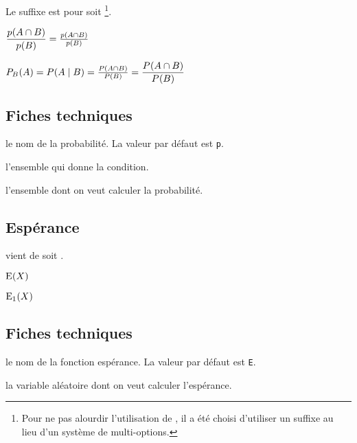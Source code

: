 \documentclass[12pt,a4paper]{article}
\begin{document}
Le suffixe  est pour  soit 
\footnote{
	Pour ne pas alourdir l'utilisation de , il a été choisi d'utiliser un suffixe au lieu d'un système de multi-options.
}.

\begin{latexex}
 $\probacondexp {B}{A}
= \probacondexp*{B}{A}$
\end{latexex}





\begin{latexex}
 $\probacond    [P]{B}{A}
= \probacond*   [P]{B}{A}
= \probacondexp*[P]{B}{A}
= \probacondexp [P]{B}{A}$
\end{latexex}




\subsection{Fiches techniques}



\extraspace




\IDoption{} le nom de la probabilité. La valeur par défaut est \verb+p+.

 l'ensemble qui donne la condition.

 l'ensemble dont on veut calculer la probabilité.




\subsection{Espérance}

\newparaexample{}

 vient de   soit .
\begin{latexex}
$\expval{X}$
\end{latexex}





\begin{latexex}
$\expval[E_1]{X}$
\end{latexex}




\subsection{Fiches techniques}


\IDoption{} le nom de la fonction espérance. La valeur par défaut est \verb+E+.

\IDarg{} la variable aléatoire dont on veut calculer l'espérance.
\end{document}
